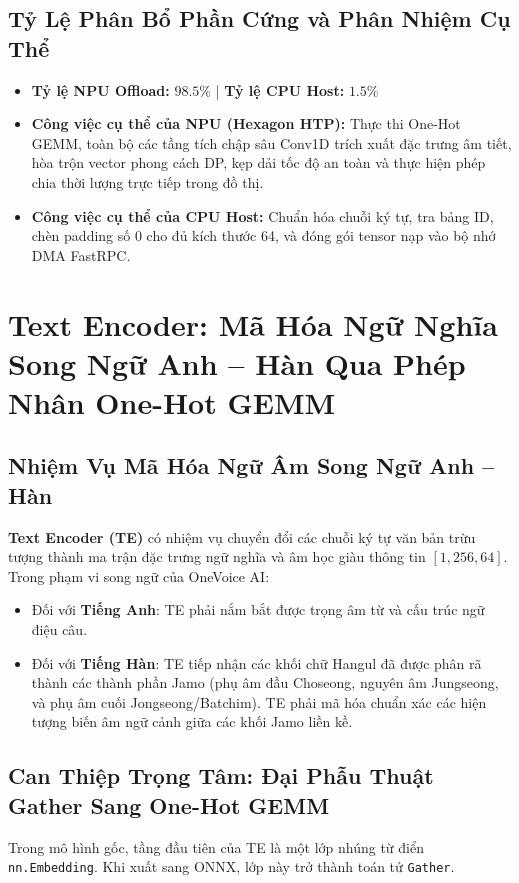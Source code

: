 \documentclass[11pt,a4paper,oneside,table]{report}
\begin{document}
\section{Tỷ Lệ Phân Bổ Phần Cứng và Phân Nhiệm Cụ Thể}
\begin{itemize}
    \item \textbf{Tỷ lệ NPU Offload:} $\mathbf{98.5\%}$ | \textbf{Tỷ lệ CPU Host:} $\mathbf{1.5\%}$
    \item \textbf{Công việc cụ thể của NPU (Hexagon HTP):} Thực thi One-Hot GEMM, toàn bộ các tầng tích chập sâu Conv1D trích xuất đặc trưng âm tiết, hòa trộn vector phong cách DP, kẹp dải tốc độ an toàn và thực hiện phép chia thời lượng trực tiếp trong đồ thị.
    \item \textbf{Công việc cụ thể của CPU Host:} Chuẩn hóa chuỗi ký tự, tra bảng ID, chèn padding số 0 cho đủ kích thước 64, và đóng gói tensor nạp vào bộ nhớ DMA FastRPC.
\end{itemize}

\chapter{Text Encoder: Mã Hóa Ngữ Nghĩa Song Ngữ Anh -- Hàn Qua Phép Nhân One-Hot GEMM}
\label{chap:te}

\section{Nhiệm Vụ Mã Hóa Ngữ Âm Song Ngữ Anh -- Hàn}
\textbf{Text Encoder (TE)} có nhiệm vụ chuyển đổi các chuỗi ký tự văn bản trừu tượng thành ma trận đặc trưng ngữ nghĩa và âm học giàu thông tin $[1, 256, 64]$. Trong phạm vi song ngữ của OneVoice AI:
\begin{itemize}
    \item Đối với \textbf{Tiếng Anh}: TE phải nắm bắt được trọng âm từ và cấu trúc ngữ điệu câu.
    \item Đối với \textbf{Tiếng Hàn}: TE tiếp nhận các khối chữ Hangul đã được phân rã thành các thành phần Jamo (phụ âm đầu Choseong, nguyên âm Jungseong, và phụ âm cuối Jongseong/Batchim). TE phải mã hóa chuẩn xác các hiện tượng biến âm ngữ cảnh giữa các khối Jamo liền kề.
\end{itemize}

\section{Can Thiệp Trọng Tâm: Đại Phẫu Thuật Gather Sang One-Hot GEMM}
Trong mô hình gốc, tầng đầu tiên của TE là một lớp nhúng từ điển \texttt{nn.Embedding}. Khi xuất sang ONNX, lớp này trở thành toán tử \texttt{Gather}.
\end{document}
